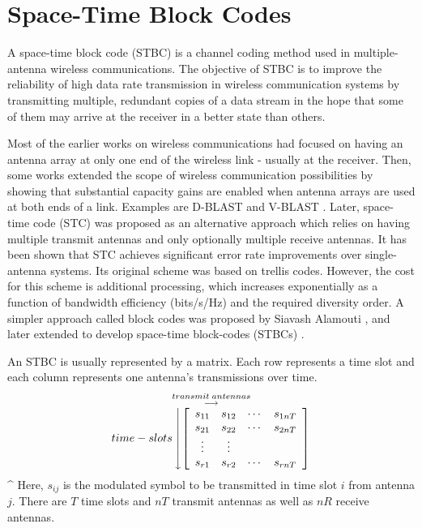 \section{Space-Time Block Codes}
A space-time block code (STBC) is a channel coding method used in
multiple-antenna wireless communications. The objective of STBC is
to improve the reliability of high data rate transmission in
wireless communication systems by transmitting multiple, redundant
copies of a data stream in the hope that some of them may arrive at
the receiver in a better state than others.

Most of the earlier works on wireless communications had focused on
having an antenna array at only one end of the wireless link -
usually at the receiver. Then, some works extended the scope of
wireless communication possibilities by showing that substantial
capacity gains are enabled when antenna arrays are used at both ends
of a link. Examples are D-BLAST \cite{15} and V-BLAST \cite{16}.
Later, space-time code \cite{5} (STC) was proposed as an alternative
approach which relies on having multiple transmit antennas and only
optionally multiple receive antennas. It has been shown that STC
achieves significant error rate improvements over single-antenna
systems. Its original scheme was based on trellis codes. However,
the cost for this scheme is additional processing, which increases
exponentially as a function of bandwidth efficiency (bits/s/Hz) and
the required diversity order. A simpler approach called block codes
was proposed by Siavash Alamouti \cite{11}, and later extended to
develop space-time block-codes (STBCs) \cite{17}.

An STBC is usually represented by a matrix. Each row represents a
time slot and each column represents one antenna's transmissions
over time.
\[
\stackrel{transmit\;antennas} { \stackrel{\longrightarrow}
{time-slots \left\downarrow \left[
\begin{array}{cccc}
s_{11} & s_{12} & \cdots & s_{1nT}\\
s_{21} & s_{22} & \cdots & s_{2nT}\\
\vdots & \vdots\\
s_{r1} & s_{r2} & \cdots & s_{rnT}\\
\end{array} \right]
\right. }}
\]^{\longrightarrow}
Here, $s_{ij}$ is the modulated symbol to be transmitted in time
slot $i$ from antenna $j$. There are $T$ time slots and $nT$
transmit antennas as well as $nR$ receive antennas.

